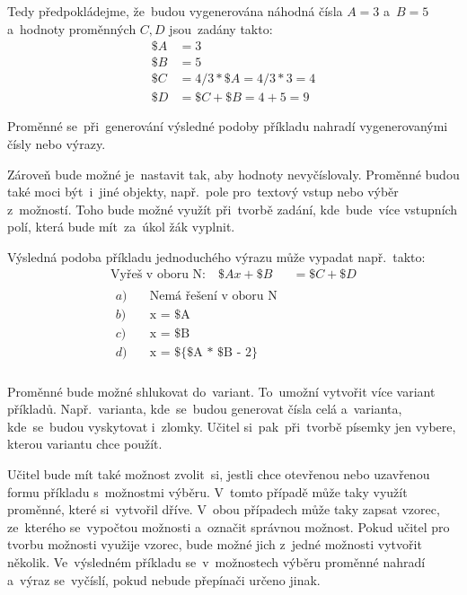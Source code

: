 \documentclass[14pt,a4paper]{article}
\begin{document}
        Tedy předpokládejme, že~budou vygenerována náhodná čísla $A = 3$ a~$B = 5$
        a~hodnoty proměnných $C, D$ jsou~zadány takto:
        \begin{align*}
            \$A &= 3 \\
            \$B &= 5 \\
            \$C &= 4/3*\$A = 4/3*3 = 4 \\
            \$D &= \$C + \$B = 4 + 5 = 9
        \end{align*}

        Proměnné se~při~generování výsledné podoby příkladu nahradí vygenerovanými čísly nebo výrazy.
        
        Zároveň bude možné je~nastavit tak, aby hodnoty nevyčíslovaly. Proměnné budou také moci být~i~jiné objekty, např.~pole pro~textový vstup nebo výběr z~možností. Toho bude možné využít při~tvorbě zadání, kde~bude~více vstupních polí, která bude mít~za~úkol žák vyplnit.

        Výsledná podoba příkladu jednoduchého výrazu může vypadat např.~takto:
        \begin{align*}
            \text{Vyřeš v oboru N:} \quad \$Ax + \$B &= \$C + \$D \\
            \begin{aligned}
                a) \quad &\text{Nemá řešení v oboru N} \\
                b) \quad &\text{x = \$A} \\
                c) \quad &\text{x = \$B} \\
                d) \quad &\text{x = \$\{\$A * \$B - 2\}} \\
            \end{aligned}
        \end{align*}

        Proměnné bude možné shlukovat do~variant. To~umožní vytvořit více variant příkladů. Např.~varianta, kde~se~budou generovat čísla celá a~varianta, kde~se~budou vyskytovat i~zlomky. Učitel si~pak~při~tvorbě písemky jen vybere, kterou variantu chce použít.

        Učitel bude mít také možnost zvolit~si, jestli chce otevřenou nebo uzavřenou formu příkladu s~možnostmi výběru. V~tomto případě může taky využít proměnné, které si~vytvořil dříve. V~obou případech může taky zapsat vzorec, ze~kterého se~vypočtou možnosti a~označit správnou možnost. Pokud učitel pro tvorbu možnosti využije vzorec, bude možné jich z~jedné možnosti vytvořit několik. Ve~výsledném příkladu se~v~možnostech výběru proměnné nahradí a~výraz se~vyčíslí, pokud nebude přepínači určeno jinak.
\end{document}
